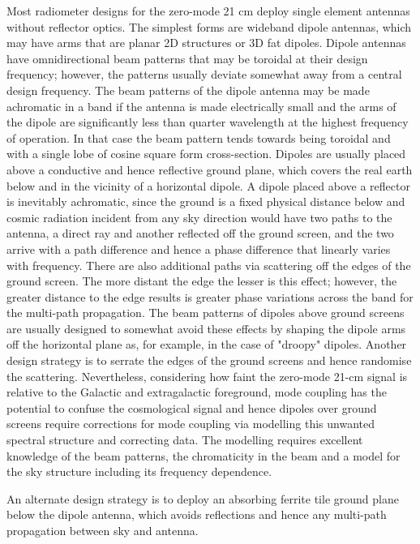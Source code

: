    Most radiometer designs for the zero-mode 21 cm deploy single element antennas without reflector optics.  The simplest forms are wideband dipole antennas, which may have arms that are planar 2D structures or 3D fat dipoles.  Dipole antennas have omnidirectional beam patterns that may be toroidal at their design frequency; however, the patterns usually deviate somewhat away from a central design frequency.  The beam patterns of the dipole antenna may be made achromatic in a band if the antenna is made electrically small and the arms of the dipole are significantly less than quarter wavelength at the highest frequency of operation.  In that case the beam pattern tends towards being toroidal and with a single lobe of cosine square form cross-section.  Dipoles are usually placed above a conductive and hence reflective ground plane, which covers the real earth below and in the vicinity of a horizontal dipole.  A dipole placed above a reflector is inevitably achromatic, since the ground is a fixed physical distance below and cosmic radiation incident from any sky direction would have two paths to the antenna, a direct ray and another reflected off the ground screen, and the two arrive with a path difference and hence a phase difference that linearly varies with frequency.  There are also additional paths via scattering off the edges of the ground screen. The more distant the edge the lesser is this effect; however, the greater distance to the edge results is greater phase variations across the band for the multi-path propagation.  The beam patterns of dipoles above ground screens are usually designed to somewhat avoid these effects by shaping the dipole arms off the horizontal plane as, for example, in the case of "droopy" dipoles.  Another design strategy is to serrate the edges of the ground screens and hence randomise the scattering. Nevertheless, considering how faint the zero-mode 21-cm signal is relative to the Galactic and extragalactic foreground, mode coupling has the potential to confuse the cosmological signal and hence dipoles over ground screens require corrections for mode coupling via modelling this unwanted spectral structure and correcting data.  The modelling requires excellent knowledge of the beam patterns, the chromaticity in the beam and a model for the sky structure including its frequency dependence.
   
   An alternate design strategy is to deploy an absorbing ferrite tile ground plane below the dipole antenna, which avoids reflections and hence any multi-path propagation between sky and antenna. 
   
